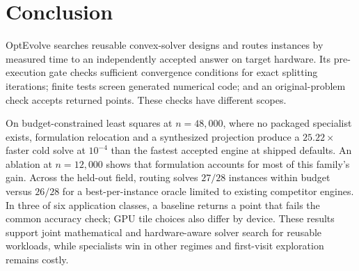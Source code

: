 \section{Conclusion}

OptEvolve searches reusable convex-solver designs and routes instances by
measured time to an independently accepted answer on target hardware. Its
pre-execution gate checks sufficient convergence conditions for exact splitting
iterations; finite tests screen generated numerical code; and an
original-problem check accepts returned points. These checks have different
scopes.

On budget-constrained least squares at $n=48{,}000$, where no packaged
specialist exists, formulation relocation and a synthesized projection produce
a $25.22\times$ faster cold solve at $10^{-4}$ than the fastest accepted engine
at shipped defaults. An ablation at $n=12{,}000$ shows that formulation
accounts for most of this family's gain. Across the
held-out field, routing solves $27/28$ instances within budget versus $26/28$
for a best-per-instance oracle limited to existing competitor engines. In
three of six application classes, a baseline returns a point that fails the common
accuracy check; GPU tile choices also differ by device. These results support
joint mathematical and hardware-aware solver search for reusable workloads,
while specialists win in other regimes and first-visit exploration remains
costly.
